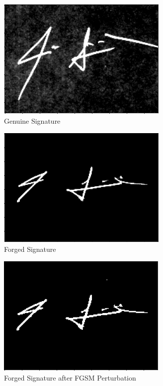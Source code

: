 \begin{figure}[h]
    \begin{center}
        \includegraphics[width=0.8\linewidth]{genuine.png}
    \end{center}
    \caption{Genuine Signature}
    \label{fig:siamese}
\end{figure}
\begin{figure}[h]
    \begin{center}
        \includegraphics[width=0.8\linewidth]{forge.png}
    \end{center}
    \caption{Forged Signature}
    \label{fig:siamese}
\end{figure}
\begin{figure}[h]
    \begin{center}
        \includegraphics[width=0.8\linewidth]{improved_forge.png}
    \end{center}
    \caption{Forged Signature after FGSM Perturbation}
    \label{fig:siamese}
\end{figure}

